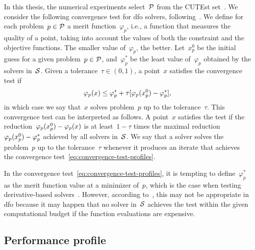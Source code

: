 In this thesis, the numerical experiments select~$\mathcal{P}$ from the CUTEst set~\cite{Gould_Orban_Toint_2015}.
We consider the following convergence test for \gls{dfo} solvers, following~\cite[\S~2]{More_Wild_2009}.
We define for each problem~$p \in \mathcal{P}$ a merit function~$\varphi_p$, i.e., a function that measures the quality of a point, taking into account the values of both the constraint and the objective functions.
The smaller value of~$\varphi_p$, the better.
Let~$x_p^0$ be the initial guess for a given problem~$p \in \mathcal{P}$, and~$\varphi_p^{\ast}$ be the least value of~$\varphi_p$ obtained by the solvers in~$\mathcal{S}$.
Given a tolerance~$\tau \in (0, 1)$, a point~$x$ satisfies the convergence test if
\begin{equation}
    \label{eq:convergence-test-profiles}
    \varphi_p(\iter) \le \varphi_p^{\ast} + \tau [\varphi_p(\iter_p^0) - \varphi_p^{\ast}],
\end{equation}
in which case we say that~$x$ solves problem~$p$ up to the tolerance~$\tau$.
This convergence test can be interpreted as follows.
A point~$x$ satisfies the test if the reduction~$\varphi_p(\iter_p^0) - \varphi_p(\iter)$ is at least~$1 - \tau$ times the maximal reduction~$\varphi_p(\iter_p^0) - \varphi_p^{\ast}$ achieved by all solvers in~$\mathcal{S}$.
We say that a solver solves the problem~$p$ up to the tolerance~$\tau$ whenever it produces an iterate that achieves the convergence test~\cref{eq:convergence-test-profiles}.

In the convergence test~\cref{eq:convergence-test-profiles}, it is tempting to define~$\varphi_p^{\ast}$ as the merit function value at a minimizer of~$p$, which is the case when testing derivative-based solvers~\cite{Dolan_More_2002}.
However, according to~\cite{More_Wild_2009}, this may not be appropriate in \gls{dfo} because it may happen that no solver in~$\mathcal{S}$ achieves the test within the given computational budget if the function evaluations are expensive.

\subsection{Performance profile}

